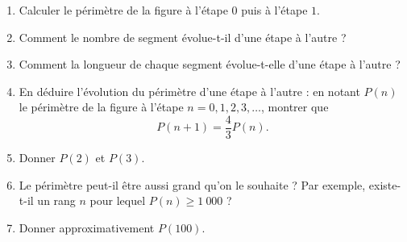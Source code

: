 \documentclass[12pt]{paper}
\theoremstyle{plain}
\theoremstyle{definition}
\begin{document}
{	\begin{enumerate}
		\item Calculer le périmètre de la figure à l'étape $0$ puis à l'étape $1$.
		\item Comment le nombre de segment évolue-t-il d'une étape à l'autre ?
		\item Comment la longueur de chaque segment évolue-t-elle d'une étape à l'autre ?
		\item En déduire l'évolution du périmètre d'une étape à l'autre :
		en notant $P(n)$ le périmètre de la figure à l'étape $n=0, 1, 2, 3,\dots$, montrer que
			\[ P(n+1) = \dfrac43 P(n). \]
		\item Donner $P(2)$ et $P(3)$.
		\item Le périmètre peut-il être aussi grand qu'on le souhaite ? Par exemple, existe-t-il un rang $n$ pour lequel $P(n) \geq 1 \ 000$ ?
		\item Donner approximativement $P(100)$.
	\end{enumerate}
}{}
\end{document}
